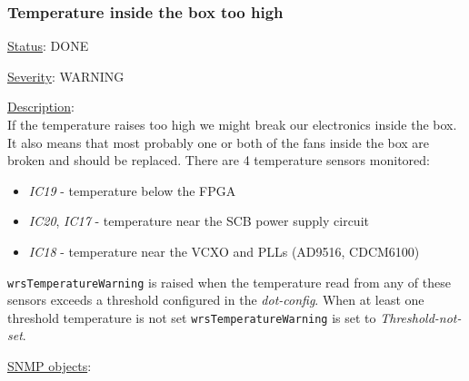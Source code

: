 \subsubsection{\bf Temperature inside the box too high}
		\label{fail:other:temp}
		\begin{pck_descr}
			\item [] \underline{Status}: DONE
			\item [] \underline{Severity}: WARNING
			\item [] \underline{Description}:\\
				If the temperature raises too high we might break our electronics inside
				the box. It also means that most probably one or both of the fans inside
				the box are broken and should be replaced. There are 4 temperature
				sensors monitored:
				\begin{itemize}
					\item \emph{IC19} - temperature below the FPGA
					\item \emph{IC20}, \emph{IC17} - temperature near the SCB power supply
						circuit
					\item \emph{IC18} - temperature near the VCXO and PLLs (AD9516,
						CDCM6100)
				\end{itemize}
				\texttt{wrsTemperatureWarning} is raised when the temperature read from
				any of these sensors exceeds a threshold configured in the
				\emph{dot-config}. When at least one threshold temperature is not set
				\texttt{wrsTemperatureWarning} is set to \emph{Threshold-not-set}.
			\item [] \underline{SNMP objects}:\\
				\\
				\\
				\\
				\\
				\\
				\\
				\\
				\\
				\\
				\\
		\end{pck_descr}

